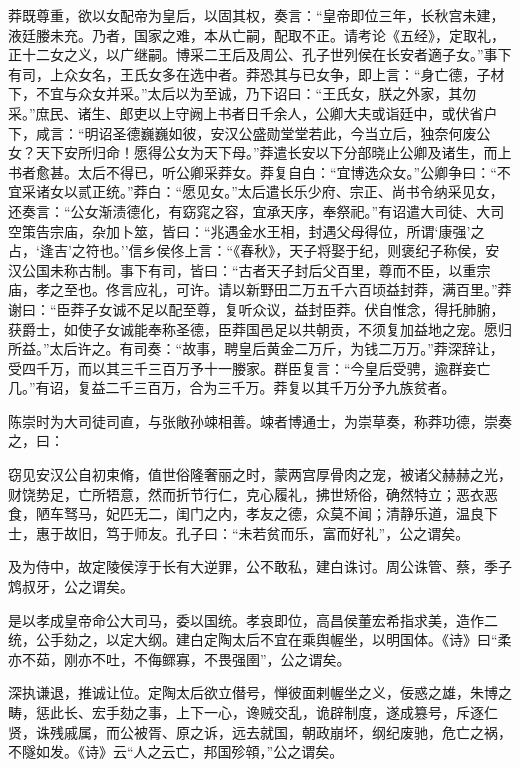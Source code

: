 \documentclass[]{article}
\begin{document}
莽既尊重，欲以女配帝为皇后，以固其权，奏言：``皇帝即位三年，长秋宫未建，液廷媵未充。乃者，国家之难，本从亡嗣，配取不正。请考论《五经》，定取礼，正十二女之义，以广继嗣。博采二王后及周公、孔子世列侯在长安者適子女。''事下有司，上众女名，王氏女多在选中者。莽恐其与已女争，即上言：``身亡德，子材下，不宜与众女并采。''太后以为至诚，乃下诏曰：``王氏女，朕之外家，其勿采。''庶民、诸生、郎吏以上守阙上书者日千余人，公卿大夫或诣廷中，或伏省户下，咸言：``明诏圣德巍巍如彼，安汉公盛勋堂堂若此，今当立后，独奈何废公女？天下安所归命！愿得公女为天下母。''莽遣长安以下分部晓止公卿及诸生，而上书者愈甚。太后不得已，听公卿采莽女。莽复自白：``宜博选众女。''公卿争曰：``不宜采诸女以贰正统。''莽白：``愿见女。''太后遣长乐少府、宗正、尚书令纳采见女，还奏言：``公女渐渍德化，有窈窕之容，宜承天序，奉祭祀。''有诏遣大司徒、大司空策告宗庙，杂加卜筮，皆曰：``兆遇金水王相，封遇父母得位，所谓`康强'之占，`逢吉'之符也。''信乡侯佟上言：``《春秋》，天子将娶于纪，则褒纪子称侯，安汉公国未称古制。事下有司，皆曰：``古者天子封后父百里，尊而不臣，以重宗庙，孝之至也。佟言应礼，可许。请以新野田二万五千六百顷益封莽，满百里。''莽谢曰：``臣莽子女诚不足以配至尊，复听众议，益封臣莽。伏自惟念，得托肺腑，获爵士，如使子女诚能奉称圣德，臣莽国邑足以共朝贡，不须复加益地之宠。愿归所益。''太后许之。有司奏：``故事，聘皇后黄金二万斤，为钱二万万。''莽深辞让，受四千万，而以其三千三百万予十一媵家。群臣复言：``今皇后受骋，逾群妾亡几。''有诏，复益二千三百万，合为三千万。莽复以其千万分予九族贫者。

陈崇时为大司徒司直，与张敞孙竦相善。竦者博通士，为崇草奏，称莽功德，崇奏之，曰：

窃见安汉公自初束脩，值世俗隆奢丽之时，蒙两宫厚骨肉之宠，被诸父赫赫之光，财饶势足，亡所牾意，然而折节行仁，克心履礼，拂世矫俗，确然特立；恶衣恶食，陋车驽马，妃匹无二，闺门之内，孝友之德，众莫不闻；清静乐道，温良下士，惠于故旧，笃于师友。孔子曰：``未若贫而乐，富而好礼''，公之谓矣。

及为侍中，故定陵侯淳于长有大逆罪，公不敢私，建白诛讨。周公诛管、蔡，季子鸩叔牙，公之谓矣。

是以孝成皇帝命公大司马，委以国统。孝哀即位，高昌侯董宏希指求美，造作二统，公手劾之，以定大纲。建白定陶太后不宜在乘舆幄坐，以明国体。《诗》曰``柔亦不茹，刚亦不吐，不侮鳏寡，不畏强圉''，公之谓矣。

深执谦退，推诚让位。定陶太后欲立僣号，惮彼面剌幄坐之义，佞惑之雄，朱博之畴，惩此长、宏手劾之事，上下一心，谗贼交乱，诡辟制度，遂成篡号，斥逐仁贤，诛残戚属，而公被胥、原之诉，远去就国，朝政崩坏，纲纪废驰，危亡之祸，不隧如发。《诗》云``人之云亡，邦国殄顇，''公之谓矣。
\end{document}

